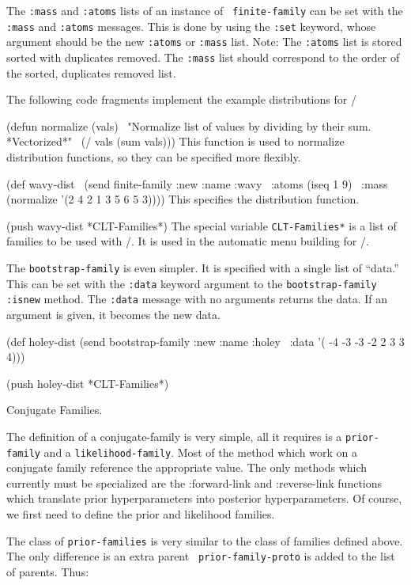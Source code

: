 The {\tt :mass\/} and {\tt :atoms\/} lists of an instance of {\tt
finite-family\/} can be set with the {\tt :mass\/} and {\tt :atoms\/}
messages.  This is done by using the {\tt :set\/} keyword, whose
argument should be the new {\tt :atoms\/} or {\tt :mass\/} list.
Note:  The {\tt :atoms\/} list is stored sorted with duplicates
removed.  The {\tt :mass\/} list should correspond to the order of the
sorted, duplicates removed list.

The following code fragments implement the example distributions for
\clttoy/

\begincode
(defun normalize (vals)
\  "Normalize list of values by dividing by their sum. *Vectorized*"
\  (/ vals (sum vals)))
\endcode
This function is used to normalize distribution functions, so they can
be specified more flexibly.

\begincode
(def wavy-dist
\     (send finite-family :new :name :wavy
\	   :atoms (iseq 1 9)
\	   :mass (normalize '(2 4 2 1 3 5 6 5 3))))
\endcode
This specifies the distribution function.

\begincode
(push wavy-dist *CLT-Families*)
\endcode
The special variable {\tt *CLT-Families*\/} is a list of families to
be used with \clttoy/.  It is used in the automatic menu
building for \clttoy/.


The {\tt bootstrap-family\/} is even simpler.  It is specified with a
single list of ``data.''  This can be set with the {\tt :data\/}
keyword argument to the {\tt bootstrap-family :isnew\/} method.
The {\tt :data\/} message with no arguments returns the data.  If an
argument is given, it becomes the new data.

\begincode
(def holey-dist (send bootstrap-family :new :name :holey
\		      :data '( -4 -3 -3 -2 2 3 3 4)))

(push holey-dist *CLT-Families*)
\endcode


 Conjugate Families.

The definition of a conjugate-family is very simple, all it requires
is a {\tt prior-family\/} and a {\tt likelihood-family\/}.  Most of the
method which work on a conjugate family reference the appropriate
value.  The only methods which currently must be specialized are the
:forward-link and :reverse-link functions which translate prior
hyperparameters into posterior hyperparameters.   Of course, we first
need to define the prior and likelihood families.

\medskip

The class of {\tt prior-families\/} is very similar to the class of
families defined above.  The only difference is an extra parent {\tt
prior-family-proto\/} is added to the list of parents.  Thus:

